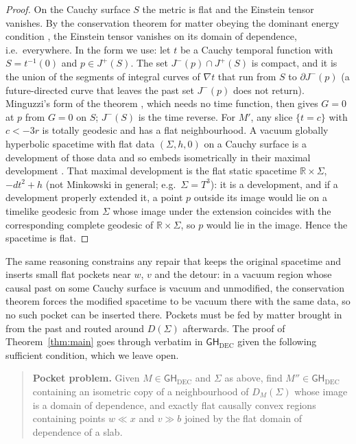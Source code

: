 \documentclass[11pt]{article}
\theoremstyle{definition}
\newcommand{\GH}{\mathsf{GH}}
\begin{document}
\begin{proof}
On the Cauchy surface $S$ the metric is flat and the Einstein tensor vanishes. By the conservation theorem
for matter obeying the dominant energy condition \citep[\S4.3]{HE1973}, the
Einstein tensor vanishes on its domain of dependence, i.e.\ everywhere. In the
form we use: let $t$ be a Cauchy temporal function with $S=t^{-1}(0)$
\citep[Thm.~1.2]{BS2006} and $p\in J^+(S)$. The set $J^-(p)\cap J^+(S)$ is compact, and
it is the union of the segments of integral curves of $\nabla t$ that run from
$S$ to $\partial J^-(p)$ (a future-directed curve that leaves the past set
$J^-(p)$ does not return). Minguzzi's form of the theorem \citep[Thm.~1]{Minguzzi2015},
which needs no time function, then gives $G=0$ at $p$ from $G=0$ on $S$;
$J^-(S)$ is the time reverse. For
$M'$, any slice $\{t=c\}$ with $c<-3r$ is totally geodesic and has a flat
neighbourhood.
A vacuum globally hyperbolic spacetime with flat data $(\Sigma,h,0)$ on a
Cauchy surface is a development of those data and so embeds isometrically in
their maximal development \citep[Thm.~3]{CBG1969}. That maximal development is
the flat static spacetime $\mathbb R\times\Sigma$, $-dt^2+h$ (not Minkowski in
general; e.g.\ $\Sigma=T^3$): it is a development, and if a development
properly extended it, a point $p$ outside its image would lie on a timelike
geodesic from $\Sigma$ whose image under the extension coincides with the
corresponding complete geodesic of $\mathbb R\times\Sigma$, so $p$ would lie in
the image. Hence the spacetime is flat.
\end{proof}

The same reasoning constrains any repair that keeps the original spacetime and
inserts small flat pockets near $w$, $v$ and the detour: in a vacuum region
whose causal past on some Cauchy surface is vacuum and unmodified, the
conservation theorem forces the modified spacetime to be vacuum there with the
same data, so no such pocket can be inserted there. Pockets must be fed by matter brought
in from the past and routed around $D(\Sigma)$ afterwards. The proof of
Theorem~\ref{thm:main} goes through verbatim in $\GH_{\mathrm{DEC}}$ given
the following sufficient condition, which we leave open.

\begin{quote}
\textbf{Pocket problem.} Given $M\in\GH_{\mathrm{DEC}}$ and $\Sigma$ as above,
find $M''\in\GH_{\mathrm{DEC}}$ containing an isometric copy of a neighbourhood
of $D_M(\Sigma)$ whose image is a domain of dependence, and exactly flat
causally convex regions containing points $w\ll x$ and $v\gg b$ joined by the
flat domain of dependence of a slab.
\end{quote}
\end{document}
